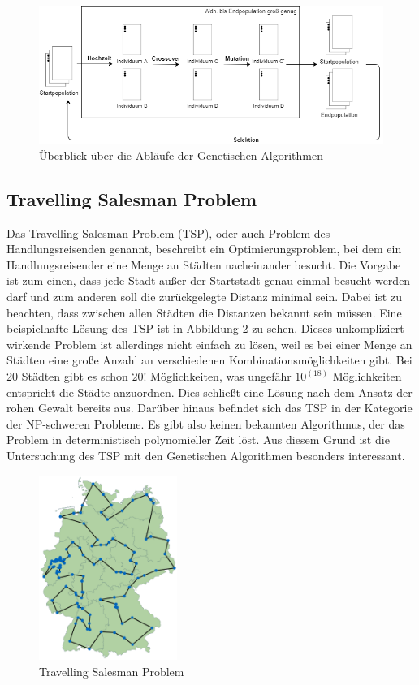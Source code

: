 \begin{figure}[H]
\centering
\includegraphics[width=1\textwidth]{img/Vortrag/Genetic_Algorithm.png}
\caption{Überblick über die Abläufe der Genetischen Algorithmen}
\label{fig:genetic_algorithm}
\end{figure}

\subsection{Travelling Salesman Problem}
Das Travelling Salesman Problem \cite[S. 132-133]{tsp} (TSP), oder auch Problem des Handlungsreisenden genannt, beschreibt ein Optimierungsproblem, bei dem ein Handlungsreisender eine Menge an Städten nacheinander besucht. Die Vorgabe ist zum einen, dass jede Stadt außer der Startstadt genau einmal besucht werden darf und zum anderen soll die zurückgelegte Distanz minimal sein. Dabei ist zu beachten, dass zwischen allen Städten die Distanzen bekannt sein müssen.
Eine beispielhafte Lösung des TSP ist in Abbildung \ref{fig:TSP} zu sehen. Dieses unkompliziert wirkende Problem ist allerdings nicht einfach zu lösen, weil es bei einer Menge an Städten eine große Anzahl an verschiedenen Kombinationsmöglichkeiten gibt. Bei 20 Städten gibt es schon $20!$ Möglichkeiten, was ungefähr $10^(18)$ Möglichkeiten entspricht die Städte anzuordnen. Dies schließt eine Lösung nach dem Ansatz der rohen Gewalt bereits aus. Darüber hinaus befindet sich das TSP in der Kategorie der NP-schweren Probleme. Es gibt also keinen bekannten Algorithmus, der das Problem in deterministisch polynomieller Zeit löst. Aus diesem Grund ist die Untersuchung des TSP mit den Genetischen Algorithmen besonders interessant.

\begin{figure}[H]
\centering
\includegraphics[width=0.4\textwidth]{img/Vortrag/tsp.png}
\caption{Travelling Salesman Problem}
\label{fig:TSP}
\end{figure}

